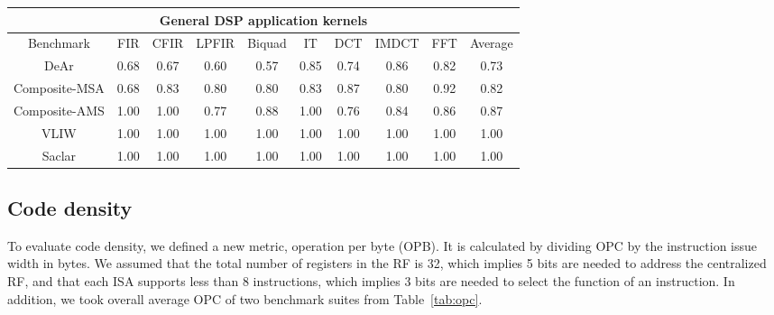 {\begin{table}[!ht]
{\begin{tabular}{|c|c|c|c|c|c|c|c|c|c|}
                \multicolumn{10}{|c|}{\textbf{General DSP application kernels}}                     \\ \hline
                Benchmark  &  FIR  &  CFIR  &  LPFIR  &  Biquad  &  IT  &  DCT  &  IMDCT  &  FFT  &  Average \\ \hline 
                DeAr  &   0.68  &   0.67  &  0.60  &   0.57  &   0.85  &   0.74  &   0.86  &   0.82  &   0.73     \\ \hline 
                Composite-MSA  &   0.68  &   0.83  &   0.80  &   0.80  &   0.83  &   0.87  &   0.80  &   0.92  &   0.82     \\ \hline 
                Composite-AMS  &   1.00  &   1.00  &   0.77  &   0.88  &   1.00  &   0.76  &   0.84  &   0.86  &   0.87     \\ \hline 
                VLIW  &   1.00  &   1.00  &   1.00  &   1.00  &   1.00  &   1.00  &   1.00  &   1.00  &   1.00     \\ \hline 
                Saclar  &   1.00  &   1.00  &   1.00  &   1.00  &   1.00  &   1.00  &   1.00  &   1.00  &   1.00     \\ \hline 
            \end{tabular}
        }
    \end{table}
    \subsection{Code density}
    To evaluate code density, we defined a new metric, operation per byte (OPB).
    It is calculated by dividing OPC by the instruction issue width in bytes.
    We assumed that the total number of registers in the RF is 32, 
    which implies 5 bits are needed to address the centralized RF, 
    and that each ISA supports less than 8 instructions,
    which implies 3 bits are needed to select the function of an instruction.
    In addition, we took overall average OPC of two benchmark suites from Table~\ref{tab:opc}.

}

